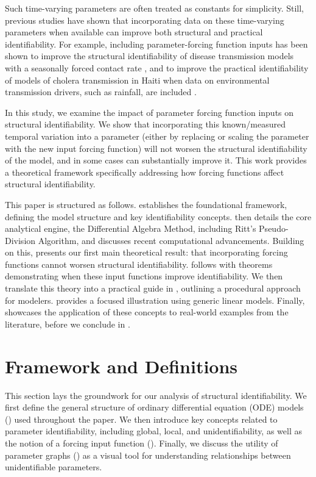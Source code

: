 \documentclass[a4paper,fleqn]{cas-dc}
\theoremstyle{definition}
\begin{document}
Such time-varying parameters are often treated as constants for simplicity. Still, previous studies have shown that incorporating data on these time-varying parameters when available can improve both structural and practical identifiability.
For example, including parameter-forcing function inputs has been shown to improve the structural identifiability of disease transmission models with a seasonally forced contact rate \cite{evansStructuralIdentifiabilitySusceptible2005}, and to improve the practical identifiability of models of cholera transmission in Haiti when data on environmental transmission drivers, such as rainfall, are included \cite{eisenberg2013examining}.

\vspace{0.2cm}
\noindent In this study, we examine the impact of parameter forcing function inputs on structural identifiability. We show that incorporating this known/measured temporal variation into a parameter (either by replacing or scaling the parameter with the new input forcing function) will not worsen the structural identifiability of the model, and in some cases can substantially improve it. This work provides a theoretical framework specifically addressing how forcing functions affect structural identifiability.

This paper is structured as follows.  establishes the foundational framework, defining the model structure and key identifiability concepts.  then details the core analytical engine, the Differential Algebra Method, including Ritt's Pseudo-Division Algorithm, and discusses recent computational advancements. Building on this,  presents our first main theoretical result: that incorporating forcing functions cannot worsen structural identifiability.  follows with theorems demonstrating when these input functions improve identifiability. We then translate this theory into a practical guide in , outlining a procedural approach for modelers.  provides a focused illustration using generic linear models. Finally,  showcases the application of these concepts to real-world examples from the literature, before we conclude in .

\section{Framework and Definitions} \label{s:def}
\noindent This section lays the groundwork for our analysis of structural identifiability. We first define the general structure of ordinary differential equation (ODE) models () used throughout the paper. We then introduce key concepts related to parameter identifiability, including global, local, and unidentifiability, as well as the notion of a forcing input function (). Finally, we discuss the utility of parameter graphs () as a visual tool for understanding relationships between unidentifiable parameters.
\end{document}
